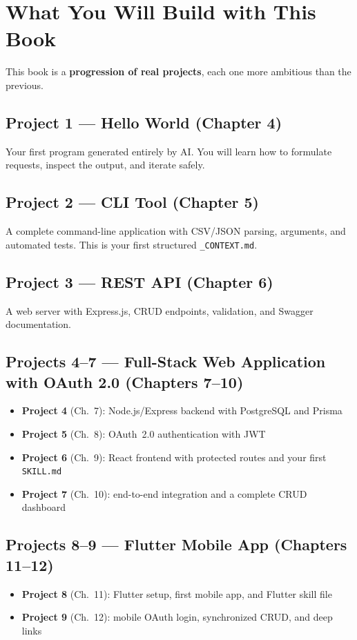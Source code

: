 \section{What You Will Build with This Book}

This book is a \textbf{progression of real projects}, each one more ambitious than the previous.

\subsection*{Project 1 --- Hello World (Chapter 4)}
Your first program generated entirely by AI. You will learn how to formulate requests, inspect the output, and iterate safely.

\subsection*{Project 2 --- CLI Tool (Chapter 5)}
A complete command-line application with CSV/JSON parsing, arguments, and automated tests. This is your first structured \texttt{\_CONTEXT.md}.

\subsection*{Project 3 --- REST API (Chapter 6)}
A web server with Express.js, CRUD endpoints, validation, and Swagger documentation.

\subsection*{Projects 4--7 --- Full-Stack Web Application with OAuth 2.0 (Chapters 7--10)}
\begin{itemize}
  \item \textbf{Project 4} (Ch.~7): Node.js/Express backend with PostgreSQL and Prisma
  \item \textbf{Project 5} (Ch.~8): OAuth~2.0 authentication with JWT
  \item \textbf{Project 6} (Ch.~9): React frontend with protected routes and your first \texttt{SKILL.md}
  \item \textbf{Project 7} (Ch.~10): end-to-end integration and a complete CRUD dashboard
\end{itemize}

\subsection*{Projects 8--9 --- Flutter Mobile App (Chapters 11--12)}
\begin{itemize}
  \item \textbf{Project 8} (Ch.~11): Flutter setup, first mobile app, and Flutter skill file
  \item \textbf{Project 9} (Ch.~12): mobile OAuth login, synchronized CRUD, and deep links
\end{itemize}

